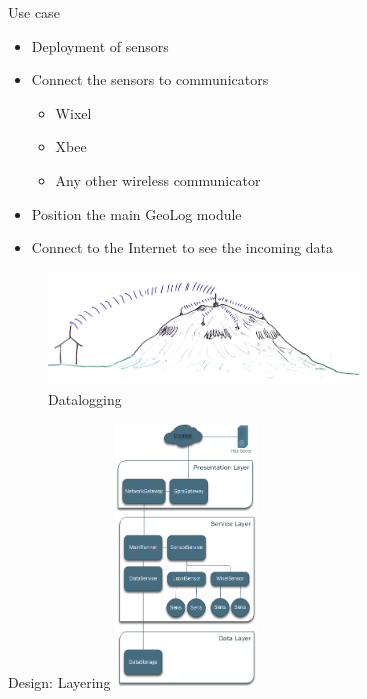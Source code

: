 \documentclass{beamer}
\begin{document}
\begin{frame}{Use case}
	\begin{itemize}
	\item Deployment of sensors
	\item Connect the sensors to communicators
		\begin{itemize}
		\item Wixel
		\item Xbee
		\item Any other wireless communicator
		\end{itemize}
	\item Position the main GeoLog module
	\item Connect to the Internet to see the incoming data
	\end{itemize}
	\begin{figure}
			\centering
	        \includegraphics[height=3cm]{graphics/GeoLog.PNG}
	        \caption{Datalogging\cite{Helgason2014}}
	\end{figure}

\end{frame}

\begin{frame}{Design: Layering}
\centering
\includegraphics[height=7cm]{graphics/Layering.png}
\end{frame}
\end{document}
